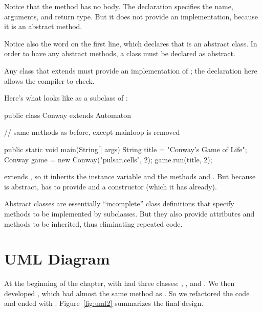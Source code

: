 Notice that the  method has no body.
The declaration specifies the name, arguments, and return type.
But it does not provide an implementation, because it is an abstract method.

Notice also the word  on the first line, which declares that  is an abstract class.
In order to have any abstract methods, a class must be declared as abstract.

Any class that extends  must provide an implementation of ; the declaration here allows the compiler to check.

Here's what  looks like as a subclass of :

\begin{code}
public class Conway extends Automaton {

    // same methods as before, except mainloop is removed

    public static void main(String[] args) {
        String title = "Conway's Game of Life";
        Conway game = new Conway("pulsar.cells", 2);
        game.run(title, 2);
    }
}
\end{code}

 extends , so it inherits the  instance variable  and the methods  and .
But because  is abstract,  has to provide  and a constructor (which it has already).

Abstract classes are essentially ``incomplete'' class definitions that specify methods to be implemented by subclasses.
But they also provide attributes and methods to be inherited, thus eliminating repeated code.


\section{UML Diagram}

At the beginning of the chapter, with had three classes: , , and .
We then developed , which had almost the same  method as .
So we refactored the code and ended with .
Figure~\ref{fig:uml2} summarizes the final design.

